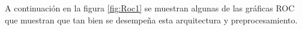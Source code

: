 		 \par A continuación en la figura \ref{fig:Roc1} se muestran algunas de las gráficas ROC que muestran que tan bien se desempeña esta arquitectura y preprocesamiento.
		\begin{figure}
		   
        \begin{table}[H]
		\centering
\end{table}
\end{figure}
